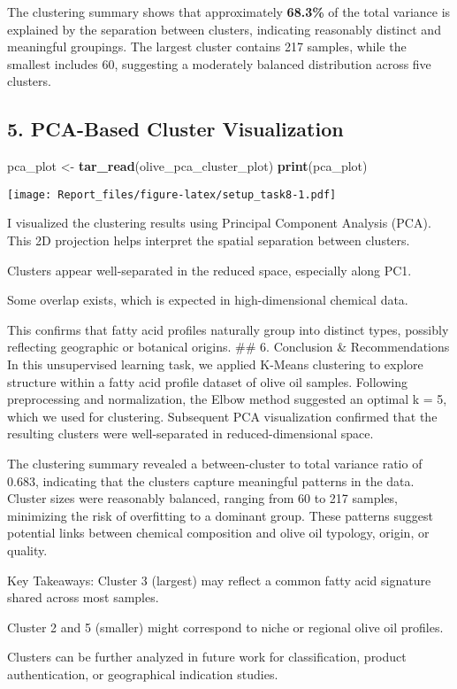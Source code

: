 \documentclass[
]{article}
\newenvironment{Shaded}{\begin{snugshade}}{\end{snugshade}}
\newcommand{\FunctionTok}[1]{\textcolor[rgb]{0.13,0.29,0.53}{\textbf{#1}}}
\newcommand{\NormalTok}[1]{#1}
\newcommand{\OtherTok}[1]{\textcolor[rgb]{0.56,0.35,0.01}{#1}}
\begin{document}
The clustering summary shows that approximately \textbf{68.3\%} of the
total variance is explained by the separation between clusters,
indicating reasonably distinct and meaningful groupings. The largest
cluster contains 217 samples, while the smallest includes 60, suggesting
a moderately balanced distribution across five clusters.

\subsection{5. PCA-Based Cluster
Visualization}\label{pca-based-cluster-visualization}

\begin{Shaded}
\begin{Highlighting}[]
\NormalTok{pca\_plot }\OtherTok{\textless{}{-}} \FunctionTok{tar\_read}\NormalTok{(olive\_pca\_cluster\_plot)}
\FunctionTok{print}\NormalTok{(pca\_plot)}
\end{Highlighting}
\end{Shaded}

\texttt{[image: Report\_files/figure-latex/setup\_task8-1.pdf]}

I visualized the clustering results using Principal Component Analysis
(PCA). This 2D projection helps interpret the spatial separation between
clusters.

Clusters appear well-separated in the reduced space, especially along
PC1.

Some overlap exists, which is expected in high-dimensional chemical
data.

This confirms that fatty acid profiles naturally group into distinct
types, possibly reflecting geographic or botanical origins. \#\# 6.
Conclusion \& Recommendations In this unsupervised learning task, we
applied K-Means clustering to explore structure within a fatty acid
profile dataset of olive oil samples. Following preprocessing and
normalization, the Elbow method suggested an optimal k = 5, which we
used for clustering. Subsequent PCA visualization confirmed that the
resulting clusters were well-separated in reduced-dimensional space.

The clustering summary revealed a between-cluster to total variance
ratio of 0.683, indicating that the clusters capture meaningful patterns
in the data. Cluster sizes were reasonably balanced, ranging from 60 to
217 samples, minimizing the risk of overfitting to a dominant group.
These patterns suggest potential links between chemical composition and
olive oil typology, origin, or quality.

Key Takeaways: Cluster 3 (largest) may reflect a common fatty acid
signature shared across most samples.

Cluster 2 and 5 (smaller) might correspond to niche or regional olive
oil profiles.

Clusters can be further analyzed in future work for classification,
product authentication, or geographical indication studies.
\end{document}
